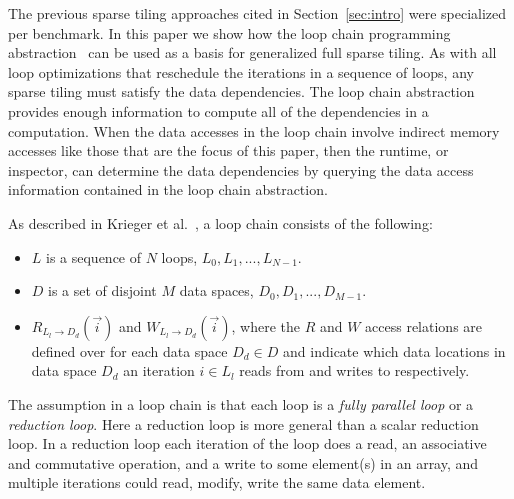 The previous sparse tiling approaches cited in Section~\ref{sec:intro} 
were specialized per benchmark.
In this paper we show how the loop chain programming abstraction~\cite{KriegerHIPS2013}
can be used as a basis for generalized full sparse tiling.
As with all loop optimizations that reschedule the iterations in a sequence of loops, 
any sparse tiling must satisfy the data dependencies.
The loop chain abstraction provides enough information 
to compute all of the dependencies in a computation.
When the data accesses in the loop chain involve indirect memory accesses
like those that are the focus of this paper, then the runtime, or inspector,
can determine the data dependencies by querying the data access information 
contained in the loop chain abstraction. %

As described in Krieger et al.~\cite{KriegerHIPS2013}, a loop chain consists
of the following:
\begin{itemize}
\item $L$ is a sequence of $N$ loops, $L_0, L_1, ..., L_{N-1}$.
\item $D$ is a set of disjoint $M$ data spaces, $D_0, D_1, ..., D_{M-1}$.
\item $R_{L_l\rightarrow D_d}(\vec{i})$ and $W_{L_l\rightarrow D_d}(\vec{i})$, 
where the $R$ and $W$ access relations are defined over for each data space $D_d \in D$
and indicate 
which data locations in data space $D_d$ an iteration $i \in L_l$
reads from and writes to respectively.
\end{itemize}

The assumption in a loop chain is that each loop is a {\em fully parallel
loop} or a {\em reduction loop}.  Here a reduction loop is more general
than a scalar reduction loop.  In a reduction loop  
each iteration of the loop does a read, an associative and commutative operation, and a write
to some element(s) in an array, and multiple iterations could read, modify, write the
same data element.


